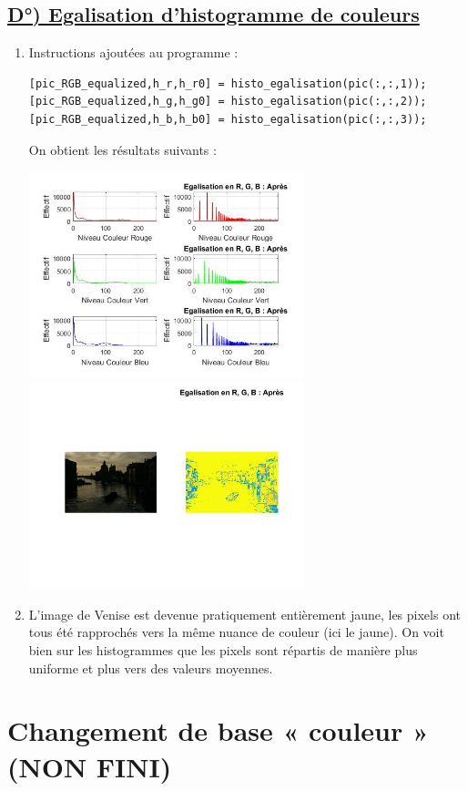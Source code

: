 \documentclass{article}
\begin{document}
\subsection*{\underline{D°) Egalisation d’histogramme de couleurs}}
\begin{enumerate}[label=\arabic*$\degres$)]
	\item Instructions ajoutées au programme :

\begin{lstlisting}
[pic_RGB_equalized,h_r,h_r0] = histo_egalisation(pic(:,:,1));
[pic_RGB_equalized,h_g,h_g0] = histo_egalisation(pic(:,:,2));
[pic_RGB_equalized,h_b,h_b0] = histo_egalisation(pic(:,:,3));
\end{lstlisting}

On obtient les résultats suivants :

\includegraphics[width=8cm]{Venise_RGB_histo_egalisation}
\includegraphics[width=8cm]{Venise_RGB_egalisation}

	\item L'image de Venise est devenue pratiquement entièrement jaune, les pixels ont tous été rapprochés vers la même nuance de couleur (ici le jaune).
On voit bien sur les histogrammes que les pixels sont répartis de manière plus uniforme et plus vers des valeurs moyennes.
\end{enumerate}

\section*{Changement de base « couleur » (NON FINI)}
\end{document}
